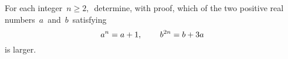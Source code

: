 For each integer $\, n \geq 2, \,$ determine, with proof, which of the two positive real numbers $\, a \,$ and $\, b \,$ satisfying \[ a^n = a + 1, \hspace{.3in} b^{2n} = b + 3a  \] is larger.